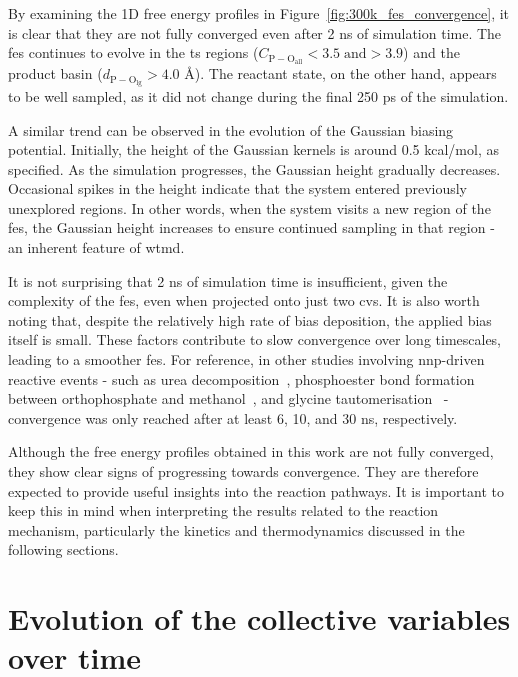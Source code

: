 By examining the 1D free energy profiles in Figure~\ref{fig:300k_fes_convergence}, it is clear that they are not fully converged even after 2 ns of simulation time. The \ac{fes} continues to evolve in the \ac{ts} regions ($C_\mathrm{P-O_{\mathrm{all}}}<3.5 \; \mathrm{and} >3.9$) and the product basin ($d_\mathrm{P-O_{\mathrm{lg}}}>4.0$ \AA). The reactant state, on the other hand, appears to be well sampled, as it did not change during the final 250 ps of the simulation.

A similar trend can be observed in the evolution of the Gaussian biasing potential. Initially, the height of the Gaussian kernels is around 0.5 kcal/mol, as specified. As the simulation progresses, the Gaussian height gradually decreases. Occasional spikes in the height indicate that the system entered previously unexplored regions. In other words, when the system visits a new region of the \ac{fes}, the Gaussian height increases to ensure continued sampling in that region - an inherent feature of \ac{wtmd}.

It is not surprising that 2 ns of simulation time is insufficient, given the complexity of the \ac{fes}, even when projected onto just two \acp{cv}. It is also worth noting that, despite the relatively high rate of bias deposition, the applied bias itself is small. These factors contribute to slow convergence over long timescales, leading to a smoother \ac{fes}. For reference, in other studies involving \ac{nnp}-driven reactive events - such as urea decomposition~\citep{yangUsingMetadynamicsBuild2022}, phosphoester bond formation between orthophosphate and methanol~\citep{benayadPrebioticChemicalReactivity2024}, and glycine tautomerisation~\citep{zhangIntramolecularWaterMediated2024} - convergence was only reached after at least 6, 10, and 30 ns, respectively.

Although the free energy profiles obtained in this work are not fully converged, they show clear signs of progressing towards convergence. They are therefore expected to provide useful insights into the reaction pathways. It is important to keep this in mind when interpreting the results related to the reaction mechanism, particularly the kinetics and thermodynamics discussed in the following sections.



\section{Evolution of the collective variables over time}

